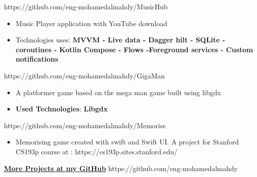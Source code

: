 \documentclass[10pt,a4paper,ragged2e,withhyper]{altacv}
\begin{document}
\begin{paracol}{1}
        {\cvrepo{\color{AndroidGreenColor}|\faGithub\faAndroid}
        {https://github.com/eng-mohamedalmahdy/MusicHub}
        }{}{}
        \begin{itemize}
            \item \textbf{} Music Player application with YouTube download
            \item Technologies uses: \textbf{MVVM - Live data - Dagger hilt - SQLite - coroutines - Kotlin Compose - Flows -\linebreak Foreground services - Custom notifications}
        \end{itemize}
        \divider


        {\cvrepo{|\faGithub\faGamepad}
        {https://github.com/eng-mohamedalmahdy/GigaMan}}{}{}
        \begin{itemize}
            \item \textbf{}A platformer game based on the mega man game built using libgdx
            \item \textbf{Used Technologies}: \textbf{Libgdx}
        \end{itemize}
        \divider

        {\cvrepo{\color{SwiftOrangeColor}|\faGithub \faSwift}
        {https://github.com/eng-mohamedalmahdy/Memorise}
        }{}{}
        \begin{itemize}
            \item \textbf{} Memorising game created with swift and Swift UI. \linebreak
            A project for Stanford CS193p course at : https://cs193p.sites.stanford.edu/
        \end{itemize}
        \divider

        \begin{center}
            \textbf{\Large \href{https://github.com/eng-mohamedalmahdy}{More Projects at my GitHub}}
            {\cvrepo{\color{GitHubColor}\faGithub}
            {https://github.com/eng-mohamedalmahdy}}{}{}
        \end{center}
        \divider
    \end{paracol}
\end{document}
